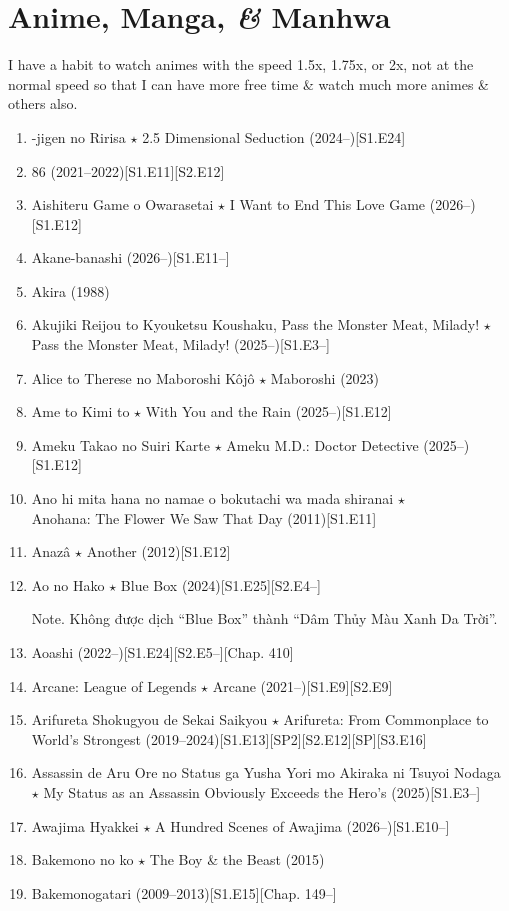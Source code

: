 \documentclass{article}
\begin{document}
\section{Anime, Manga, {\it\&} Manhwa}
I have a habit to watch animes with the speed 1.5x, 1.75x, or 2x, not at the normal speed so that I can have more free time \& watch much more animes \& others also.
\begin{enumerate}
	\item {-jigen no Ririsa $\star$ 2.5 Dimensional Seduction} (2024--)\hfill[S1.E24]
	\item 86 (2021--2022)\hfill[S1.E11][S2.E12]
	\item {\sc Aishiteru Game o Owarasetai $\star$ I Want to End This Love Game} (2026--)\hfill[S1.E12]
	\item Akane-banashi (2026--)\hfill[S1.E11--]
    \item {\sc Akira} (1988)
    \item Akujiki Reijou to Kyouketsu Koushaku, Pass the Monster Meat, Milady! $\star$ Pass the Monster Meat, Milady! (2025--)\hfill[S1.E3--]
    \item {\sc Alice to Therese no Maboroshi Kôjô $\star$ Maboroshi} (2023)
    \item {\sc Ame to Kimi to $\star$ With You and the Rain} (2025--)\hfill[S1.E12]
    \item {\sc Ameku Takao no Suiri Karte $\star$ Ameku M.D.: Doctor Detective} (2025--)\hfill[S1.E12]
    \item {\sc Ano hi mita hana no namae o bokutachi wa mada shiranai $\star$\\Anohana: The Flower We Saw That Day} (2011)\hfill[S1.E11]
    \item {\sc Anazâ $\star$ Another} (2012)\hfill[S1.E12]
    \item {\sc Ao no Hako $\star$ Blue Box} (2024)\hfill[S1.E25][S2.E4--]

    {\sf Note.} Không được dịch ``Blue Box'' thành ``Dâm Thủy Màu Xanh Da Trời''.
    \item Aoashi (2022--)\hfill[S1.E24][S2.E5--][Chap. 410]

    \item {\sc Arcane: League of Legends $\star$ Arcane} (2021--)\hfill[S1.E9][S2.E9]
    \item {\sc Arifureta Shokugyou de Sekai Saikyou $\star$ Arifureta: From Commonplace to World's Strongest} (2019--2024)\hfill[S1.E13][SP2][S2.E12][SP][S3.E16]
    \item Assassin de Aru Ore no Status ga Yusha Yori mo Akiraka ni Tsuyoi Nodaga $\star$ My Status as an Assassin Obviously Exceeds the Hero's (2025)\hfill[S1.E3--]
    \item Awajima Hyakkei $\star$ A Hundred Scenes of Awajima (2026--)\hfill[S1.E10--]
    \item {\sc Bakemono no ko $\star$ The Boy \& the Beast} (2015)
    \item {\sc Bakemonogatari} (2009--2013)\hfill[S1.E15][Chap. 149--]


\end{enumerate}
\end{document}
